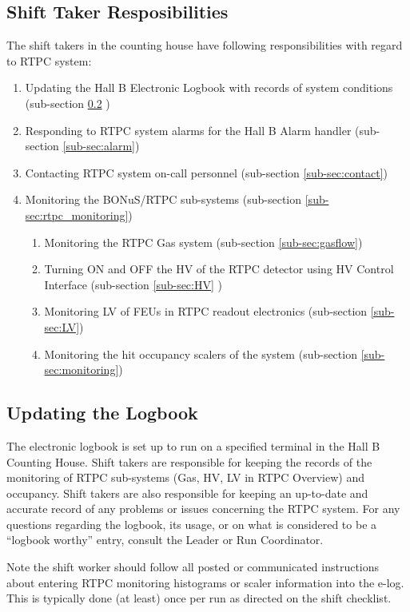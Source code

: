 
\subsection{Shift Taker Resposibilities}
 The shift takers in the counting house have following responsibilities with regard to RTPC system:
 \begin{enumerate}
 	\item Updating the Hall B Electronic Logbook with records of system conditions (sub-section \ref{sub-sec:logbook} )
 	\item Responding to RTPC system alarms for the Hall B Alarm handler (sub-section \ref{sub-sec:alarm})
 	\item Contacting RTPC system on-call personnel (sub-section \ref{sub-sec:contact})
 	\item Monitoring the BONuS/RTPC sub-systems (sub-section \ref{sub-sec:rtpc_monitoring})
 	\begin{enumerate}[label=(\alph*)]
 		\item Monitoring the RTPC Gas system (sub-section \ref{sub-sec:gasflow})
 		\item Turning ON and OFF the HV of the RTPC detector using HV Control Interface (sub-section \ref{sub-sec:HV} )
 		\item Monitoring LV of FEUs in RTPC readout electronics (sub-section \ref{sub-sec:LV})
 		\item Monitoring the hit occupancy scalers of the system (sub-section \ref{sub-sec:monitoring})
 	\end{enumerate}
 \end{enumerate}
\subsection{Updating the Logbook}
\label{sub-sec:logbook}
The electronic logbook is set up to run on a specified terminal in the Hall B Counting House. Shift takers are responsible for keeping the records of the monitoring of RTPC sub-systems (Gas, HV, LV in RTPC Overview) and occupancy. Shift takers are also responsible for keeping an up-to-date and accurate record of any problems or issues concerning the RTPC system. For any questions regarding the logbook, its usage, or on what is considered to be a “logbook worthy” entry, consult the Leader or Run Coordinator.

Note the shift worker should follow all posted or communicated instructions about entering RTPC monitoring histograms or scaler information into the e-log. This is typically done (at least) once per run as directed on the shift checklist.

